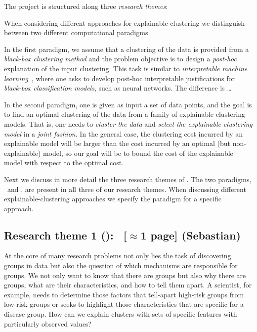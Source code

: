 \documentclass[a4paper,11pt]{article}
\begin{document}

The project is structured along three {\em research themes}:

\begin{description}
\setlength{\itemsep}{-2pt}
\item[\rto.~\newmodels\,:] 

\item[\rtw.~\clusterings\,:] 

\item[\rth.~\covariates\,:]
\end{description}

When considering different approaches for explainable clustering we distinguish between 
two different computational paradigms. 
\begin{description}
\setlength{\itemsep}{-2pt}
\item[\posthoc\,:]
In the first paradigm, we assume that a clustering of the data is provided 
from a \emph{black-box clustering method} and the problem objective is to design 
a \emph{post-hoc} explanation of the input clustering.
This task is similar to \emph{interpretable machine learning}~\cite{XXX}, 
where one asks to develop post-hoc interpretable justifications for 
\emph{black-box classification models}, such as neural networks. 
The difference is \ldots 
\item[\joint\,:]
In the second paradigm, one is given as input a set of data points, 
and the goal is to find an optimal clustering of the data
from a family of explainable clustering models.
That is, one needs to \emph{cluster the data} and \emph{select the explainable clustering model}
in a \emph{joint fashion}.
In the general case, the clustering cost incurred by an explainable model 
will be larger than the cost incurred by an optimal (but non-explainable) model, 
so our goal will be to bound the cost of the explainable model with respect to the optimal cost.
\end{description}

Next we discuss in more detail the three research themes of \acronym.
The two paradigms, \posthoc\ and \joint, are present in all three of our research themes.
When discussing different explainable-clustering approaches 
we specify the paradigm for a specific approach.

\subsection*{Research theme 1 (\rto): \newmodels\ {\color{orange}[$\approx$1 page]} {\color{teal}(Sebastian)}}
At the core of many research problems not only lies the task of discovering groups in data but also 
the question of which mechanisms are responsible for groups.
We not only want to know that there are groups but also why there are groups, what are their characteristics, and how to tell them apart.  
A scientist, for example, needs to determine those factors that tell-apart high-risk groups from low-risk groups or seeks to highlight those characteristics that are specific for a disease group.  
How can we explain clusters with sets of specific features with particularly observed values?
\end{document}
